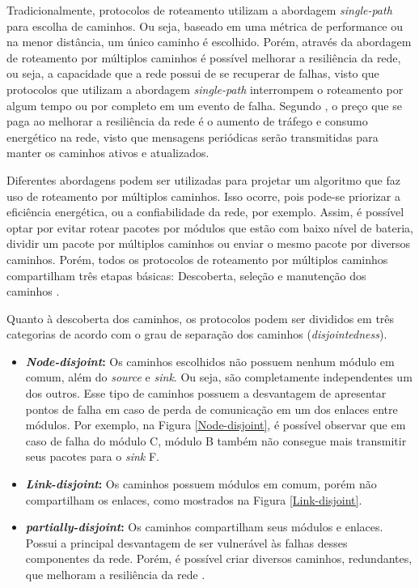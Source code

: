 Tradicionalmente, protocolos de roteamento utilizam a abordagem \textit{single-path} para escolha de caminhos. Ou seja, baseado em uma métrica de performance ou na menor distância, um único caminho é escolhido. Porém, através da abordagem de roteamento por múltiplos caminhos é possível melhorar a resiliência da rede, ou seja, a capacidade que a rede possui de se recuperar de falhas, visto que protocolos que utilizam a abordagem \textit{single-path} interrompem o roteamento por algum tempo ou por completo em um evento de falha. Segundo , o preço que se paga ao melhorar a resiliência da rede é o aumento de tráfego e consumo energético na rede, visto que mensagens periódicas serão transmitidas para manter os caminhos ativos e atualizados. 

Diferentes abordagens podem ser utilizadas para projetar um algoritmo que faz uso de roteamento por múltiplos caminhos. Isso ocorre, pois pode-se priorizar a eficiência energética, ou a confiabilidade da rede, por exemplo. Assim, é possível optar por evitar rotear pacotes por módulos que estão com baixo nível de bateria, dividir um pacote por múltiplos caminhos ou enviar o mesmo pacote por diversos caminhos. Porém, todos os protocolos de roteamento por múltiplos caminhos compartilham três etapas básicas: Descoberta, seleção e manutenção dos caminhos \cite{radi2012multipath}.

Quanto à descoberta dos caminhos, os protocolos podem ser divididos em três categorias de acordo com o grau de separação dos caminhos (\textit{disjointedness}).

\begin{itemize}
  \item \textbf{\textit{Node-disjoint}:} Os caminhos escolhidos não possuem nenhum módulo em comum, além do \textit{source} e \textit{sink}. Ou seja, são completamente independentes um dos outros. Esse tipo de caminhos possuem a desvantagem de apresentar pontos de falha em caso de perda de comunicação em um dos enlaces entre módulos. Por exemplo, na Figura \ref{Node-disjoint}, é possível observar que em caso de falha do módulo C, módulo B também não consegue mais transmitir seus pacotes para o \textit{sink} F. 
  \item \textbf{\textit{Link-disjoint}:} Os caminhos possuem módulos em comum, porém não compartilham os enlaces, como mostrados na Figura \ref{Link-disjoint}. 
  \item \textbf{\textit{partially-disjoint}:} Os caminhos compartilham seus módulos e enlaces. Possui a principal desvantagem de ser vulnerável às falhas desses componentes da rede. Porém, é possível criar diversos caminhos, redundantes, que melhoram a resiliência da rede \cite{radi2012multipath}. 
\end{itemize}

